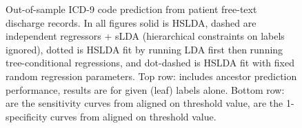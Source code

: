 \documentclass{article}
\begin{document}
\begin{figure}[htbp]
\begin{center}
\caption{Out-of-sample ICD-9 code prediction from patient free-text discharge records.  In all figures solid is HSLDA, dashed are independent regressors + sLDA (hierarchical constraints on labels ignored), dotted is HSLDA fit by running LDA first then running tree-conditional regressions, and dot-dashed is HSLDA fit with fixed random regression parameters.  Top row:   includes ancestor prediction performance,   results are for given (leaf) labels alone.  Bottom row:  are the sensitivity curves from  aligned on threshold value,   are the 1-specificity curves from  aligned on threshold value.}
\label{fig:icd9}
\end{center}
\end{figure}
\end{document}
